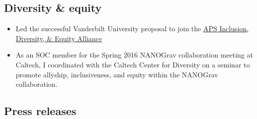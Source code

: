 \documentclass[11pt,letterpaper,sans]{moderncv}
\begin{document}
 \vspace{-0.1cm}
 \vspace{-0.1cm}
 \vspace{-0.1cm}

\subsection{Diversity \& equity}
\begin{itemize}[leftmargin=8mm]
\item Led the successful Vanderbilt University proposal to join the {\color{color1} \href{https://www.aps.org/programs/innovation/fund/idea.cfm}{APS Inclusion, Diversity, \& Equity Alliance}}
\item As an SOC member for the Spring 2016 NANOGrav collaboration meeting at Caltech, I coordinated with the Caltech Center for Diversity on a seminar to promote allyship, inclusiveness, and equity within the NANOGrav collaboration. 
\end{itemize}

\subsection{Press releases}
\end{document}
